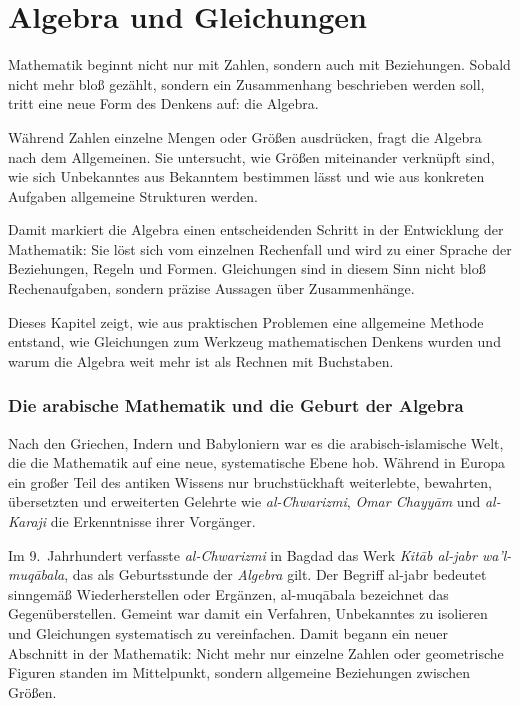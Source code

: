 \chapter{Algebra und Gleichungen}
\label{chap:III_algebra}

Mathematik beginnt nicht nur mit Zahlen, sondern auch mit Beziehungen.
Sobald nicht mehr bloß gezählt, sondern ein Zusammenhang beschrieben werden soll,
tritt eine neue Form des Denkens auf:
die Algebra.

Während Zahlen einzelne Mengen oder Größen ausdrücken,
fragt die Algebra nach dem Allgemeinen.
Sie untersucht, wie Größen miteinander verknüpft sind,
wie sich Unbekanntes aus Bekanntem bestimmen lässt
und wie aus konkreten Aufgaben allgemeine Strukturen werden.

Damit markiert die Algebra einen entscheidenden Schritt
in der Entwicklung der Mathematik:
Sie löst sich vom einzelnen Rechenfall
und wird zu einer Sprache der Beziehungen, Regeln und Formen.
Gleichungen sind in diesem Sinn
nicht bloß Rechenaufgaben,
sondern präzise Aussagen über Zusammenhänge.

Dieses Kapitel zeigt,
wie aus praktischen Problemen eine allgemeine Methode entstand,
wie Gleichungen zum Werkzeug mathematischen Denkens wurden
und warum die Algebra weit mehr ist
als Rechnen mit Buchstaben.
\subsection{Die arabische Mathematik und die Geburt der Algebra}
\label{sec:3.1_arabische_mathematik}

Nach den Griechen, Indern und Babyloniern
war es die arabisch-islamische Welt,
die die Mathematik auf eine neue, systematische Ebene hob.
Während in Europa ein großer Teil des antiken Wissens nur bruchstückhaft weiterlebte,
bewahrten, übersetzten und erweiterten Gelehrte wie
\emph{al-Chwarizmi},
\emph{Omar Chayyām} und
\emph{al-Karaji}
die Erkenntnisse ihrer Vorgänger.

Im 9.~Jahrhundert verfasste \emph{al-Chwarizmi} in Bagdad das Werk
\emph{Kitāb al-jabr wa’l-muqābala},
das als Geburtsstunde der \emph{Algebra} gilt.
Der Begriff \glqq al-jabr\grqq{} bedeutet sinngemäß \glqq Wiederherstellen\grqq{} oder \glqq Ergänzen\grqq,
\glqq al-muqābala\grqq{} bezeichnet das \glqq Gegenüberstellen\grqq.
Gemeint war damit ein Verfahren, Unbekanntes zu isolieren
und Gleichungen systematisch zu vereinfachen.
Damit begann ein neuer Abschnitt in der Mathematik:
Nicht mehr nur einzelne Zahlen oder geometrische Figuren standen im Mittelpunkt,
sondern allgemeine Beziehungen zwischen Größen.


